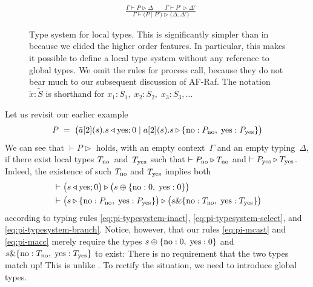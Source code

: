 \documentclass[a4paper,12pt,oneside,fleqn]{book} %
\begin{document}
\begin{figure}
\begin{center}
\begin{align}
  \label{eq:pi-typesystem-branch}
\\[1ex]
&\frac
  {\Gamma \vdash P \triangleright \Delta
    \qquad \Gamma \vdash P' \triangleright \Delta'}
  {\Gamma \vdash \bigl(P\mid P'\bigr)
    \triangleright \bigl(\Delta,\Delta'\bigr)}
\end{align}
\end{center}
\caption{
  Type system for local types.
  This is significantly simpler than in
    \cite{DBLP:journals/jacm/HondaYC16}
    because we elided the higher order features.
  In particular,
    this makes it possible to define a local type system
    without any reference to global types.
  We omit the rules for process call,
    because they do not bear much to our subsequent discussion of AF-Raf.
  The notation $\tilde{x}:\tilde{S}$
    is shorthand for
    $x_1:S_1,\; x_2:S_2,\; x_3:S_3, \ldots$
}
\label{fig:pi-typesystem-local}
\end{figure}

Let us revisit our earlier example
\begin{align}
  P \;=\;
  \bigl(
  \bar{a}[2](s). s\triangleleft {\rm yes}; 0
    \mid a[2](s). s\triangleright\{{\rm no} : P_{\rm no},\;
      {\rm yes} : P_{\rm yes} \}
  \bigr)
\end{align}
We can see that $\vdash P \triangleright $ holds,
  with an empty context~$\Gamma$ and an empty typing~$\Delta$,
  if there exist local types $T_{\rm no}$~and~$T_{\rm yes}$
  such that $\vdash P_{\rm no}\triangleright T_{\rm no}$
    and $\vdash P_{\rm yes}\triangleright T_{\rm yes}$.
Indeed,
  the existence of such $T_{\rm no}$ and $T_{\rm yes}$
    implies both
\begin{align}
  &\vdash \bigl(s \triangleleft {\rm yes}; 0\bigr)
    \triangleright
    \bigl(s \oplus \{{\rm no}:0,\; {\rm yes}:0\}\bigr)
\\
  &\vdash \bigl(s\triangleright\{{\rm no} : P_{\rm no},\;
      {\rm yes} : P_{\rm yes} \}\bigr)
    \triangleright
    \bigl(s \& \{{\rm no}:T_{\rm no},\; {\rm yes}:T_{\rm yes}\} \bigr)
\end{align}
according to typing rules
  \eqref{eq:pi-typesystem-inact},
  \eqref{eq:pi-typesystem-select}, and
  \eqref{eq:pi-typesystem-branch}.
Notice, however,
  that our rules \eqref{eq:pi-mcast} and \eqref{eq:pi-macc}
  merely require the types
    $s \oplus \{{\rm no}:0,\; {\rm yes}:0\}$
  and
    $s \& \{{\rm no}:T_{\rm no},\; {\rm yes}:T_{\rm yes}\}$
  to exist:
There is no requirement that the two types match up!
This is unlike \cite{DBLP:journals/jacm/HondaYC16}.
To rectify the situation,
  we need to introduce global types.
\end{document}
